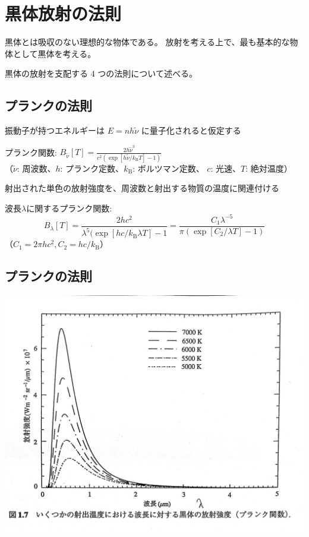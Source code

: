 \documentclass[article,nontitlepage,]{dennou777}
\begin{document}
\section{黒体放射の法則}

黒体とは吸収のない理想的な物体である。
放射を考える上で、最も基本的な物体として黒体を考える。

黒体の放射を支配する 4 つの法則について述べる。

\subsection{プランクの法則}
振動子が持つエネルギーは $E=nh\tilde{\nu}$ に量子化されると仮定する

プランク関数: $\displaystyle B_{\tilde{\nu}}[T]=\frac{2h\tilde{\nu}^3}{c^2(\exp[h\tilde{\nu}/k_\mathrm{B}T]-1)}$\\
{\scriptsize （$\tilde{\nu}$: 周波数、$h$: プランク定数、$k_\mathrm{B}$: ボルツマン定数、
$c$: 光速、$T$: 絶対温度）}

射出された単色の放射強度を、周波数と射出する物質の温度に関連付ける

波長$\lambda$に関するプランク関数:
\[B_\lambda[T]=\frac{2hc^2}{\lambda^5(\exp[hc/k_\mathrm{B}\lambda T]-1}=
	\frac{C_1\lambda^{-5}}{\pi(\exp[C_2/\lambda T]-1)}\]
{\scriptsize （$C_1=2\pi hc^2, C_2=hc/k_\mathrm{B}$）}

\subsection{プランクの法則}
\includegraphics[width=\textwidth]{planck.jpg}
\end{document}
